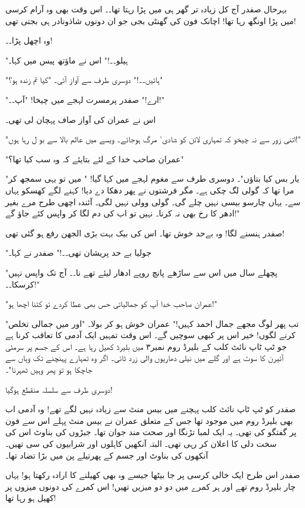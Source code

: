 بہرحال صفدر آج کل زیادہ تر گھر ہی میں پڑا رہتا تھا۔۔ اس وقت بھی وہ آرام کرسی میں پڑا اونگھ رہا تھا! اچانک فون کی گھنٹی بجی جو ان دونوں شاذونادر ہی بجتی تھی!

وہ اچھل پڑا۔۔!

"ہیلو۔۔!" اس نے ماؤتھ پیس میں کہا۔

"ہائیں۔۔!" دوسری طرف سے آواز آئی۔ "کیا تم زندہ ہو؟"

"ارے!" صفدر پرمسرت لہجے میں چیخا! "آپ۔۔!"

اس نے عمران کی آواز صاف پہچان لی تھی۔

"اتنی زور سے نہ چیخو کہ تمہاری لائن کو شادیٴ مرگ ہوجائے۔ ویسے میں عالم بالا سے بو ل رہا ہوں!"

"عمران صاحب خدا کے لئے بتایئے کہ وہ سب کیا تھا؟"

"یار بس کیا بتاؤں"۔ دوسری طرف سے مغوم لہجے میں کہا گیا! " میں تو یہی سمجھ کر مرا تھا کہ گولی لگ چکی ہے۔ مگر فرشتوں نے پھر دھکا دے دیا! کہنے لگے کھسکو یہاں سے۔ یہاں چارسو بیسی نہیں چلے گی۔ گولی وولی نہیں لگی۔ آئندہ اچھی طرح مرے بغیر ادھر کا رخ بھی نہ کرنا۔ نہیں تو اب کی دم لگا کر واپس کئے جاؤ گے!"

صفدر ہنسنے لگا! وہ بےحد خوش تھا۔ اس کی بیک بہت بڑی الجھن رفع ہو گئی تھی!

"جولیا بے حد پریشان تھی۔۔!" صفدر نے کہا۔

"پچھلے سال میں اس سے ساڑھے پانچ روپے ادھار لیئے تھے نا۔۔ آج تک واپس نہیں کرسکا۔۔!"

"عمران صاحب خدا آپ کو جمالیاتی حس بھی عطا کردے تو کتنا اچھا ہو!"

"تب پھر لوگ مجھے جمال احمد کہیں!" عمران خوش ہو کر بولا۔ "اور میں جمالی تخلص کرنے لگوں! خیر اس پر کبھی سوچیں گے۔ اس وقت تمہیں ایک آدمی کا تعاقب کرنا ہے جو ٹپ ٹاپ نائٹ کلب کے بلیرڈ روم نمبر۳ میں بلیرڈ کھیل رہا ہے۔ اس کے جسم پر سرمئی آئیرن کا سوٹ ہے اور گلے میں نیلی دھاریوں والی زرد ٹائی۔ اگر وہ تمہارے پہنچنے تک وہاں سے جاچکا ہو تو پھر وہیں ٹھہرنا"۔

دوسری طرف سے سلسلہ منقطع ہوگیا!

صفدر کو ٹپ ٹاپ نائٹ کلب پہچنے میں بیس منٹ سے زیادہ نہیں لگے تھے! وہ آدمی اب بھی بلیرڈ روم میں موجود تھا جس کے متعلق عمران نے بیس منٹ پہلے اس سے فون پر گفتگو کی تھی۔ یہ ایک لمبا تڑنگا اور صحت مند جوان تھا۔ جبڑوں کی بناوٹ اس کی سخت دلی کا اعلان کر رہی تھی۔ البتہ آنکھیں کاہلوں اور شرابیوں کی سی تھیں۔ آنکھوں کی بناوٹ اور جسم کے پھرتیلے پن میں بڑا تضاد تھا۔

صفدر اس طرح ایک خالی کرسی پر جا بیٹھا جیسے وہ بھی کھیلنے کا ارادہ رکھتا ہو! یہاں چار بلیرڈ روم تھے اور ہر کمرے میں دو دو میزیں تھیں! اس کمرے کی دونوں میزوں پر کھیل ہو رہا تھا!

